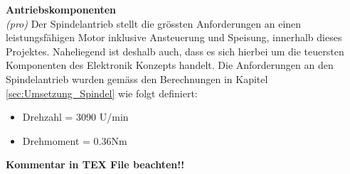 \textbf{Antriebskomponenten}\\
\textit{(pro)} Der Spindelantrieb stellt die grössten Anforderungen an einen leistungsfähigen Motor inklusive Ansteuerung und Speisung, innerhalb dieses Projektes. Naheliegend ist deshalb auch, dass es sich hierbei um die teuersten Komponenten des Elektronik Konzepts handelt. Die Anforderungen an den Spindelantrieb wurden gemäss den Berechnungen in Kapitel \ref{sec:Umsetzung_Spindel} wie folgt definiert: 

\begin{itemize}
	\item Drehzahl = 3090 U/min
	\item Drehmoment = 0.36Nm	
\end{itemize}

\textbf{Kommentar in TEX File beachten!!}


